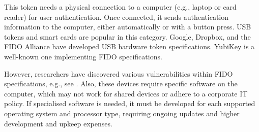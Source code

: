 






This token needs a physical connection to a computer (e.g., laptop or card reader) for user authentication. Once connected, it sends authentication information to the computer, either automatically or with a button press. USB tokens and smart cards are popular in this category. Google, Dropbox, and the FIDO Alliance have developed USB hardware token specifications. YubiKey is a well-known one implementing FIDO specifications.





However, researchers have discovered various vulnerabilities within FIDO specifications, e.g., see  \cite{PanosMNPX17,ChangMSS17,LoutfiJ15,ndss/FengLP021}.  Also, these devices require specific software on the computer, which may not work for shared devices or adhere to a corporate IT policy. If specialised software is needed, it must be developed for each supported operating system and processor type, requiring ongoing updates and higher development and upkeep expenses.




